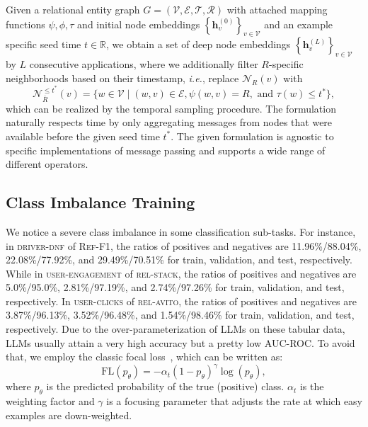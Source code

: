 \documentclass[11pt]{article}
\begin{document}
Given a relational entity graph $G=(\mathcal{V}, \mathcal{E}, \mathcal{T}, \mathcal{R})$ with attached mapping functions $\psi, \phi, \tau$ and initial node embeddings $\left\{\mathbf{h}_v^{(0)}\right\}_{v \in \mathcal{V}}$ and an example specific seed time $t \in \mathbb{R}$, we obtain a set of deep node embeddings $\left\{\mathbf{h}_v^{(L)}\right\}_{v \in \mathcal{V}}$ by $L$ consecutive applications, where we additionally filter $R$-specific neighborhoods based on their timestamp, \emph{i.e.}, replace $\mathcal{N}_R(v)$ with
\begin{equation}
    \mathcal{N}_{\bar{R}}^{\leq t^*}(v)=\{w \in \mathcal{V} \mid(w, v) \in \mathcal{E}, \psi(w, v)=R, \text { and } \tau(w) \leq t^*\},
\end{equation}
which can be realized by the temporal sampling procedure. The formulation naturally respects time by only aggregating messages from nodes that were available before the given seed time $t^*$. The given formulation is agnostic to specific implementations of message passing and supports a wide range of different operators.

\subsection{Class Imbalance Training}
We notice a severe class imbalance in some classification sub-tasks. For instance, in \textsc{driver-dnf} of \textsc{Ref-F1}, the ratios of positives and negatives are 11.96\%/88.04\%, 22.08\%/77.92\%, and 29.49\%/70.51\% for train, validation, and test, respectively. While in \textsc{user-engagement} of \textsc{rel-stack}, the ratios of positives and negatives are 5.0\%/95.0\%, 2.81\%/97.19\%, and 2.74\%/97.26\% for train, validation, and test, respectively. In \textsc{user-clicks} of \textsc{rel-avito}, the ratios of positives and negatives are 3.87\%/96.13\%, 3.52\%/96.48\%, and 1.54\%/98.46\% for train, validation, and test, respectively.
Due to the over-parameterization of LLMs on these tabular data, LLMs usually attain a very high accuracy but a pretty low AUC-ROC. To avoid that, we employ the classic focal loss~\citep{lin2017focal}, which can be written as:
\begin{equation}
    \mathrm{FL}\left(p_\theta\right)=-\alpha_t\left(1-p_\theta\right)^\gamma \log \left(p_\theta\right),
\end{equation}
where $p_\theta$ is the predicted probability of the true (positive) class. $\alpha_t$ is the weighting factor and $\gamma$ is a focusing parameter that adjusts the rate at which easy examples are down-weighted. 
\end{document}
